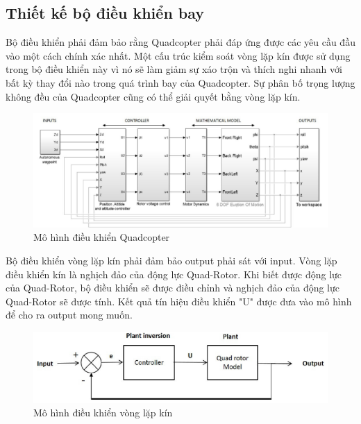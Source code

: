 {     \subsection{Thiết kế bộ điều khiển bay}
            Bộ điều khiển phải đảm bảo rằng Quadcopter phải đáp ứng được các yêu cầu đầu vào một cách chính xác nhất. Một cấu trúc kiểm soát vòng lặp kín được sử dụng trong bộ điều khiển này vì nó sẽ làm giảm sự xáo trộn và thích nghi nhanh với bất kỳ thay đổi nào trong quá trình bay của Quadcopter. Sự phân bố trọng lượng không đều của Quadcopter cũng có thể giải quyết bằng vòng lặp kín.
            \\
            \begin{figure}[h!]
	        	\begin{center}
	        		\includegraphics[scale=0.8]{images/Cuong-ModelofQc.png}
	        		\caption{Mô hình điều khiển Quadcopter}
	        	\end{center}
        \end{figure}
            Bộ điều khiển vòng lặp kín phải đảm bảo output phải sát với input. Vòng lặp điều khiển kín là nghịch đảo của động lực Quad-Rotor. Khi biết được động lực của Quad-Rotor, bộ điều khiển sẽ được điều chỉnh và nghịch đảo của động lực Quad-Rotor sẽ được tính. Kết quả tín hiệu điều khiển "U" được đưa vào mô hình để cho ra output mong muốn.
            \begin{figure}[h!]
	        	\begin{center}
	        		\includegraphics[scale=0.8]{images/Cuong-ClosedLoopControl.png}
	        		\caption{Mô hình điều khiển vòng lặp kín}
	        	\end{center}
        \end{figure} 
}
